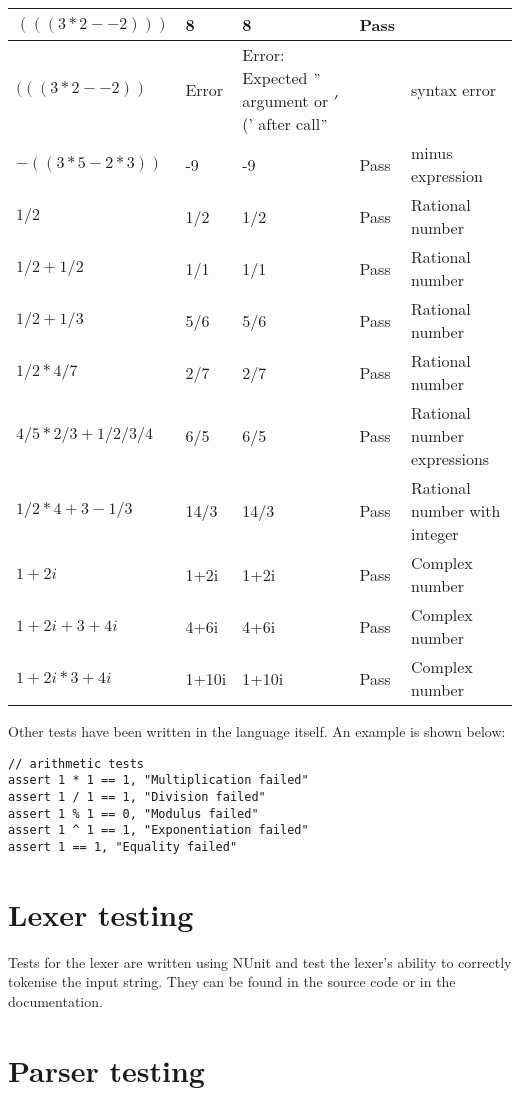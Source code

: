 \begin{table}[h]
\begin{tabular}{|p{1.8in}|p{0.5in}|p{0.4in}|p{0.6in}|p{1.4in}|}
    $(((3*2--2)))$ & 8 & 8 & Pass & \\ \hline
    $(((3*2--2))$ & Error & Error: Expected \("\)argument or \('\)(' after call\("\) & & syntax error \\ \hline
    $-((3*5-2*3))$ & -9 & -9 & Pass & minus expression \\ \hline
    $1/2$ & 1/2 & 1/2 & Pass & Rational number \\ \hline
    $1/2 + 1/2$ & 1/1 & 1/1 & Pass & Rational number \\ \hline
    $1/2 + 1/3$ & 5/6 & 5/6 & Pass & Rational number \\ \hline
    $1/2 * 4/7$ & 2/7 & 2/7 & Pass & Rational number \\ \hline 
    $4/5 * 2/3 + 1/2 / 3/4$ & 6/5 & 6/5 & Pass & Rational number expressions \\ \hline
    $1/2 * 4 + 3 - 1/3$ & 14/3 & 14/3 & Pass & Rational number with integer \\ \hline
    $1+2i$ & 1+2i & 1+2i & Pass & Complex number \\ \hline
    $1+2i + 3+4i$ & 4+6i & 4+6i & Pass & Complex number \\ \hline
    $1+2i * 3+4i$ & 1+10i & 1+10i & Pass & Complex number \\ \hline
    \end{tabular}
    \label{tab:table2}
\end{table}

Other tests have been written in the language itself.
An example is shown below:

\begin{verbatim}
// arithmetic tests
assert 1 * 1 == 1, "Multiplication failed"
assert 1 / 1 == 1, "Division failed"
assert 1 % 1 == 0, "Modulus failed"
assert 1 ^ 1 == 1, "Exponentiation failed"
assert 1 == 1, "Equality failed"
\end{verbatim}

\section{Lexer testing}\label{sec:lexer-testing}

Tests for the lexer are written using NUnit and test the lexer's ability to correctly tokenise the input string.
They can be found in the source code or in the documentation.

\section{Parser testing}\label{sec:parser-testing}

